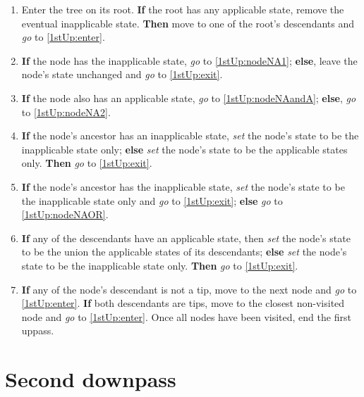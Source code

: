 \documentclass[a4paper,12pt]{article}
\begin{document}
\begin{enumerate}
    \item Enter the tree on its root. \textbf{If} the root has any applicable state, remove the eventual inapplicable state. \textbf{Then} move to one of the root's descendants and \textit{go} to \ref{1stUp:enter}.
    \item \label{1stUp:enter} \textbf{If} the node has the inapplicable state, \textit{go} to \ref{1stUp:nodeNA1}; \textbf{else}, leave the node's state unchanged and \textit{go} to \ref{1stUp:exit}.
    \item \label{1stUp:nodeNA1} \textbf{If} the node also has an applicable state, \textit{go} to \ref{1stUp:nodeNAandA}; \textbf{else}, \textit{go} to \ref{1stUp:nodeNA2}.
    \item \label{1stUp:nodeNAandA} \textbf{If} the node's ancestor has an inapplicable state, \textit{set} the node's state to be the inapplicable state only; \textbf{else} \textit{set} the node's state to be the applicable states only. \textbf{Then} \textit{go} to \ref{1stUp:exit}.
    \item \label{1stUp:nodeNA2} \textbf{If} the node's ancestor has the inapplicable state, \textit{set} the node's state to be the inapplicable state only and \textit{go} to \ref{1stUp:exit}; \textbf{else} \textit{go} to \ref{1stUp:nodeNAOR}.
    \item \label{1stUp:nodeNAOR} \textbf{If} any of the descendants have an applicable state, then \textit{set} the node's state to be the union the applicable states of its descendants; \textbf{else} \textit{set} the node's state to be the inapplicable state only. \textbf{Then} \textit{go} to \ref{1stUp:exit}.
    \item \label{1stUp:exit} \textbf{If} any of the node's descendant is not a tip, move to the next node and \textit{go} to \ref{1stUp:enter}. \textbf{If} both descendants are tips, move to the closest non-visited node and \textit{go} to \ref{1stUp:enter}. Once all nodes have been visited, end the first uppass.
\end{enumerate}


\section{Second downpass} \label{2ndDp}
\end{document}
